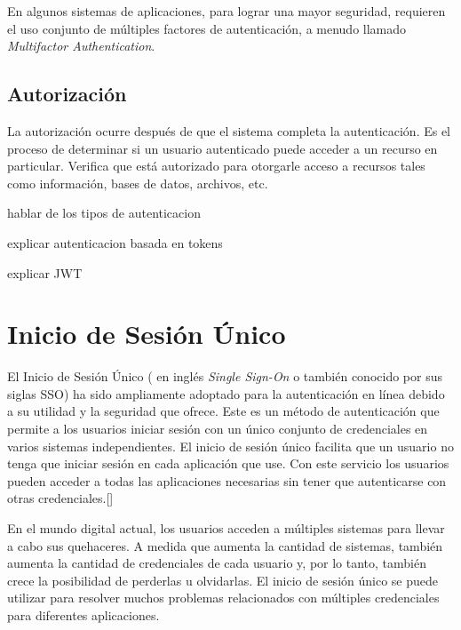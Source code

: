 En algunos sistemas de aplicaciones, para lograr una mayor seguridad, requieren el uso conjunto de múltiples factores de autenticación, a menudo llamado \textit{Multifactor Authentication}.

\subsection{Autorización}
La autorización ocurre después de que el sistema completa la autenticación. Es el proceso de determinar si un usuario autenticado puede acceder a un recurso en particular. Verifica que está autorizado para otorgarle acceso a recursos tales como información, bases de datos, archivos, etc.



hablar de los tipos de autenticacion

explicar autenticacion basada en tokens 

explicar JWT



\section{Inicio de Sesión Único}
El Inicio de Sesión Único ( en inglés \textit{Single Sign-On} o también conocido por sus siglas SSO) ha sido ampliamente adoptado para la autenticación en línea debido a su utilidad y la seguridad que ofrece. Este es un método de autenticación que permite a los usuarios iniciar sesión con un único conjunto de credenciales en varios sistemas independientes. El inicio de sesión único facilita que un usuario no tenga que iniciar sesión en cada aplicación que use. Con este servicio los usuarios pueden acceder a todas las aplicaciones necesarias sin tener que autenticarse con otras credenciales.[\cite{microsoft-doc}]

En el mundo digital actual, los usuarios acceden a múltiples sistemas para llevar a cabo sus quehaceres. A medida que aumenta la cantidad de sistemas, también aumenta la cantidad de credenciales de cada usuario y, por lo tanto, también crece la posibilidad de perderlas u olvidarlas. El inicio de sesión único se puede utilizar para resolver muchos problemas relacionados con múltiples credenciales para diferentes aplicaciones. 

